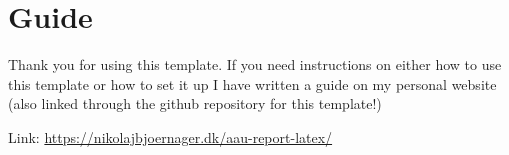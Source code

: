 \chapter*{Guide} %

Thank you for using this template. If you need instructions on either how to use this template or how to set it up I have written a guide on my personal website (also linked through the github repository for this template!)

\vspace{1cm}

Link: \url{https://nikolajbjoernager.dk/aau-report-latex/}